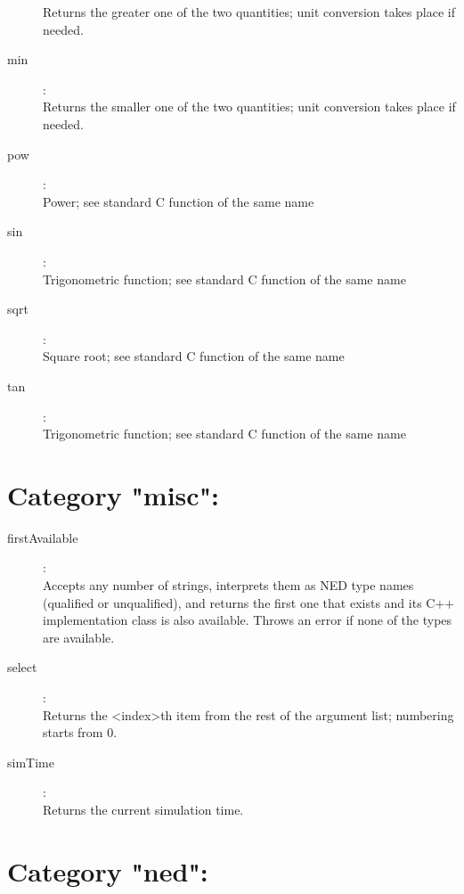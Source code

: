 \begin{description}
    Returns the greater one of the two quantities; unit conversion takes place if needed.
\item[min]:  \\
    Returns the smaller one of the two quantities; unit conversion takes place if needed.
\item[pow]:  \\
    Power; see standard C function of the same name
\item[sin]:  \\
    Trigonometric function; see standard C function of the same name
\item[sqrt]:  \\
    Square root; see standard C function of the same name
\item[tan]:  \\
    Trigonometric function; see standard C function of the same name

\end{description}

\section{Category "misc":}
\label{sec:ned-functions:category-misc}

\begin{description}
\item[firstAvailable]:  \\
    Accepts any number of strings, interprets them as NED type names (qualified or unqualified), and returns the first one that exists and its C++ implementation class is also available. Throws an error if none of the types are available.
\item[select]:  \\
    Returns the <index>th item from the rest of the argument list; numbering starts from 0.
\item[simTime]:  \\
    Returns the current simulation time.
\end{description}

\section{Category "ned":}
\label{sec:ned-functions:category-ned}

